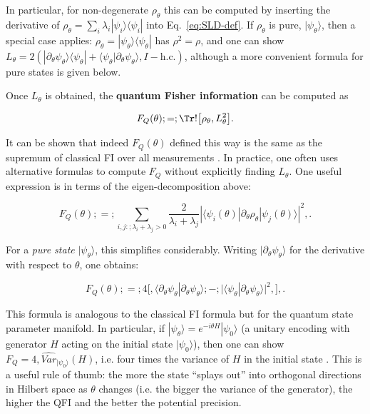 In particular, for non-degenerate $\rho_\theta$ this can be computed
by inserting the derivative of $\rho_\theta = \sum_i \lambda_i
|\psi_i\rangle\langle\psi_i|$ into Eq.~\eqref{eq:SLD-def}. If
$\rho_\theta$ is pure, $|\psi_\theta\rangle$, then a special case
applies: $\rho_\theta = |\psi_\theta\rangle\langle\psi_\theta|$ has
$\rho^2=\rho$, and one can show $L_\theta = 2(|\partial_\theta
\psi_\theta\rangle\langle \psi_\theta| + \langle
\psi_\theta|\partial_\theta \psi_\theta\rangle, I - \text{h.c.})$,
although a more convenient formula for pure states is given below.



Once $L_\theta$ is obtained, the \textbf{quantum Fisher information} can be computed as

\begin{equation}
F_Q(\theta) ;=; \Tr!\big[\rho_\theta, L_\theta^2\big].
\label{eq:QFI-def}
\end{equation}

It can be shown that indeed $F_Q(\theta)$ defined this way is the same
as the supremum of classical FI over all measurements
\cite{Helstrom1976, Holevo2011, BraunsteinCaves1994}. In practice, one
often uses alternative formulas to compute $F_Q$ without explicitly
finding $L_\theta$. One useful expression is in terms of the
eigen-decomposition above:

\begin{equation}
F_Q(\theta) ;=; \sum_{i,j:; \lambda_i + \lambda_j >0} \frac{2}{\lambda_i + \lambda_j} \left|\langle \psi_i(\theta)|\partial_\theta \rho_\theta|\psi_j(\theta)\rangle\right|^2 ,.
\label{eq:QFI-eigen}
\end{equation}

For a \textit{pure state} $|\psi_\theta\rangle$, this simplifies
considerably. Writing $|\partial_\theta \psi_\theta\rangle$ for the
derivative with respect to $\theta$, one obtains:

\begin{equation}
F_Q(\theta) ;=; 4 \Big[, \langle \partial_\theta \psi_\theta | \partial_\theta \psi_\theta \rangle ;-; \big|\langle \psi_\theta | \partial_\theta \psi_\theta \rangle\big|^2,\Big] ,.
\label{eq:QFI-pure}
\end{equation}

This formula is analogous to the classical FI formula but for the
quantum state parameter manifold. In particular, if
$|\psi_\theta\rangle = e^{-i\theta H}|\psi_0\rangle$ (a unitary
encoding with generator $H$ acting on the initial state
$|\psi_0\rangle$), then one can show $F_Q =
4,\widehat{Var}_{|\psi_0\rangle}(H)$, i.e. four times the variance of $H$ in
the initial state \cite{BraunsteinCaves1994, Paris2009}. This is a
useful rule of thumb: the more the state “splays out” into orthogonal
directions in Hilbert space as $\theta$ changes (i.e. the bigger the
variance of the generator), the higher the QFI and the better the
potential precision.



